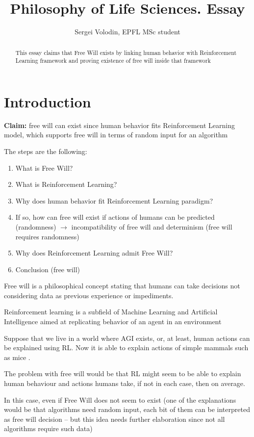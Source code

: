 \documentclass[a4paper]{article}
\title{Philosophy of Life Sciences. Essay}
\author{Sergei Volodin, EPFL MSc student}
\date{}
\begin{document}
\maketitle

\begin{abstract}
This essay claims that Free Will exists by linking human behavior with Reinforcement Learning framework and proving existence of free will inside that framework
\end{abstract}

\section{Introduction}
{\bf Claim:} free will can exist since human behavior fits Reinforcement Learning model, which supports free will in terms of random input for an algorithm

The steps are the following:
\begin{enumerate}
	\item What is Free Will?
	\item What is Reinforcement Learning?
	\item Why does human behavior fit Reinforcement Learning paradigm?
	\item If so, how can free will exist if actions of humans can be predicted (randomness) $\rightarrow$ incompatibility of free will and determinism (free will requires randomness)
	\item Why does Reinforcement Learning admit Free Will?
	\item Conclusion (free will)
\end{enumerate}

Free will is a philosophical concept stating that humans can take decisions not considering data as previous experience or impediments.


Reinforcement learning is a subfield of Machine Learning and Artificial Intelligence aimed at replicating behavior of an agent in an environment \cite{sutton}

Suppose that we live in a world where AGI exists, or, at least, human actions can be explained using RL.
Now it is able to explain actions of simple mammals such as mice \cite{oist}.

The problem with free will would be that RL might seem to be able to explain human behaviour and actions humans take, if not in each case, then on average.

In this case, even if Free Will does not seem to exist (one of the explanations would be that algorithms need random input, each bit of them can be interpreted as free will decision -- but this idea needs further elaboration since not all algorithms require such data)
\end{document}
